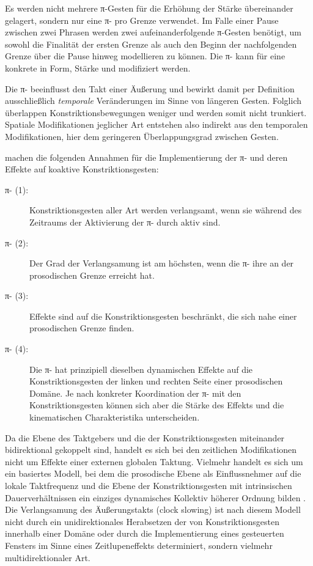 Es werden nicht mehrere π-Gesten für die Erhöhung der Stärke übereinander gelagert, sondern nur eine π- pro Grenze verwendet. Im Falle einer Pause zwischen zwei Phrasen werden zwei aufeinanderfolgende π-Gesten benötigt, um sowohl die Finalität der ersten Grenze als auch den Beginn der nachfolgenden Grenze über die Pause hinweg modellieren zu können. Die π- kann für eine konkrete  in Form, Stärke und  modifiziert werden.

Die π- beeinflusst den Takt einer Äußerung und bewirkt damit per Definition ausschließlich \textit{temporale} Veränderungen im Sinne von längeren Gesten. Folglich überlappen Konstriktionsbewegungen weniger und werden somit nicht trunkiert. Spatiale Modifikationen jeglicher Art entstehen also indirekt aus den temporalen Modifikationen, hier dem geringeren Überlappungsgrad zwischen Gesten.

\citet[][161--163]{Byrd2003a} machen die folgenden Annahmen für die Implementierung der π- und deren Effekte auf koaktive Konstriktionsgesten:


\begin{description}
	\item[π- (1):] Konstriktionsgesten aller Art werden verlangsamt, wenn sie während des Zeitraums der Aktivierung der π- durch  aktiv sind.
	\item[π- (2):] Der Grad der Verlangsamung ist am höchsten, wenn die π- ihre  an der prosodischen Grenze erreicht hat.
	\item[π- (3):] Effekte sind auf die Konstriktionsgesten beschränkt, die sich nahe einer prosodischen Grenze finden.
	\item[π- (4):] Die π- hat prinzipiell dieselben dynamischen Effekte auf die Konstriktionsgesten der linken und rechten Seite einer prosodischen Domäne. Je nach konkreter Koordination der π- mit den Konstriktionsgesten können sich aber die Stärke des Effekts und die kinematischen Charakteristika unterscheiden.
\end{description}

Da die Ebene des Taktgebers und die der Konstriktionsgesten miteinander bidirektional gekoppelt sind, handelt es sich bei den zeitlichen Modifikationen nicht um Effekte einer externen globalen Taktung. Vielmehr handelt es sich um ein  basiertes Modell, bei dem die prosodische Ebene als Einflussnehmer auf die lokale Taktfrequenz und die Ebene der Konstriktionsgesten mit intrinsischen Dauerverhältnissen ein einziges dynamisches Kollektiv höherer Ordnung bilden \citep[][156]{Byrd2003a}. Die Verlangsamung des Äußerungstakts (clock slowing) ist nach diesem Modell nicht durch ein unidirektionales Herabsetzen der  von Konstriktionsgesten innerhalb einer Domäne oder durch die Implementierung eines  gesteuerten Fensters im Sinne eines Zeitlupeneffekts determiniert, sondern vielmehr multidirektionaler Art.

